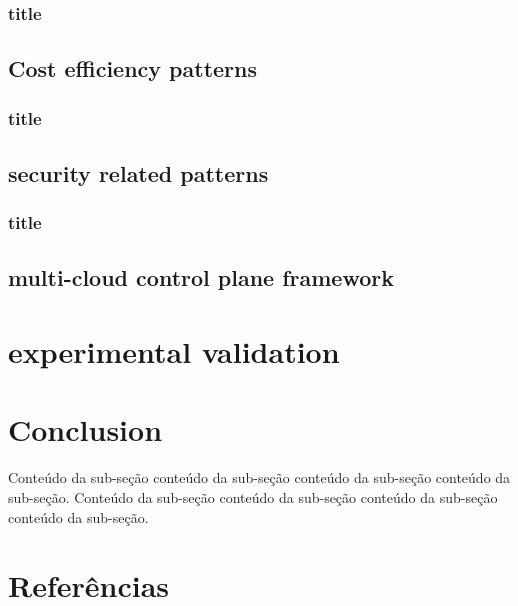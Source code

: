 \documentclass[12pt]{article}
\begin{document}
	\subsubsection{title}
	
	\subsection{Cost efficiency patterns}

	\subsubsection{title}

	\subsection{security related patterns}

    \subsubsection{title}
	
	\subsection{multi-cloud control plane framework}
	
	\section{experimental validation}
	
	\section{Conclusion}
		
	Conteúdo da sub-seção conteúdo da sub-seção conteúdo da sub-seção conteúdo da sub-seção.
	\noindent Conteúdo da sub-seção conteúdo da sub-seção conteúdo da sub-seção conteúdo da sub-seção.
    
    \section*{Referências}
     
	
	
	
\end{document}
